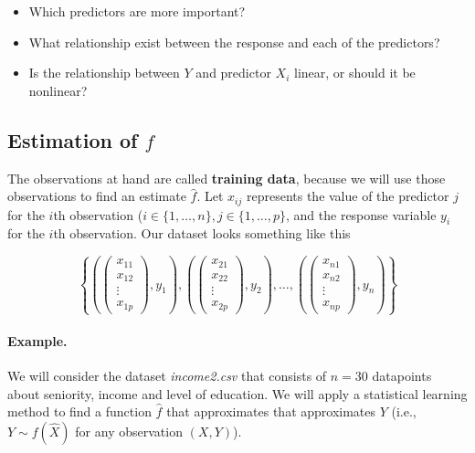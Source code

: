 \documentclass[11pt]{article}
\providecommand{\tightlist}{%
      \setlength{\itemsep}{0pt}\setlength{\parskip}{0pt}}
\begin{document}
\begin{itemize}
\tightlist
\item
  Which predictors are more important?
\item
  What relationship exist between the response and each of the
  predictors?
\item
  Is the relationship between \(Y\) and predictor \(X_i\) linear, or
  should it be nonlinear?
\end{itemize}

    \hypertarget{estimation-of-f}{%
\subsection{\texorpdfstring{Estimation of
\(f\)}{Estimation of f}}\label{estimation-of-f}}

The observations at hand are called \textbf{training data}, because we
will use those observations to find an estimate \(\hat{f}\). Let
\(x_{ij}\) represents the value of the predictor \(j\) for the \(i\)th
observation (\(i\in \{1,\ldots,n\}, j\in \{1,\ldots,p\}\), and the
response variable \(y_i\) for the \(i\)th observation. Our dataset looks
something like this

\begin{equation}
\left\{
\left(
\left( 
\begin{matrix}
x_{11}\\
x_{12}\\
\vdots \\
x_{1p}
\end{matrix}\right),
y_1 \right), 
\left(
\left( 
\begin{matrix}
x_{21}\\
x_{22}\\
\vdots \\
x_{2p}
\end{matrix}\right),
y_2 \right),
\ldots,
\left(
\left( 
\begin{matrix}
x_{n1}\\
x_{n2}\\
\vdots \\
x_{np}
\end{matrix}\right),
y_n
\right)
\right\}
\end{equation}

    \hypertarget{example.}{%
\paragraph{Example.}\label{example.}}

We will consider the dataset \emph{income2.csv} that consists of
\(n=30\) datapoints about seniority, income and level of education. We
will apply a statistical learning method to find a function \(\hat{f}\)
that approximates that approximates \(Y\) (i.e., \(Y \sim f(\hat{X})\)
for any observation \((X,Y)\)).
\end{document}
